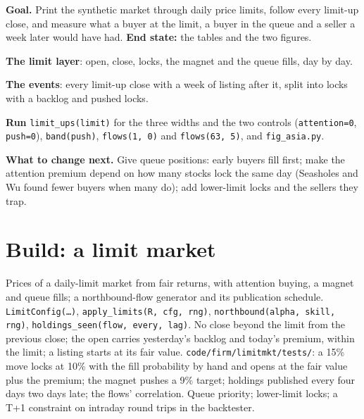 \begin{tutorial}
\textbf{Goal.} Print the synthetic market through daily price limits, follow every limit-up close, and measure what a buyer at the limit, a buyer in
the queue and a seller a week later would have had. \textbf{End state:} the tables and the two figures.
\begin{tutsteps}
\item \textbf{The limit layer}: open, close, locks, the magnet and the queue fills, day by day.
\label{lst:s1:asia-specific-equity-strategies:limits}
\item \textbf{The events}: every limit-up close with a week of listing after it, split into locks with a backlog and pushed locks.
\label{lst:s1:asia-specific-equity-strategies:ups}
\item \textbf{Run} \texttt{limit\_ups(limit)} for the three widths and the two controls (\texttt{attention=0}, \texttt{push=0}), \texttt{band(push)},
\texttt{flows(1, 0)} and \texttt{flows(63, 5)}, and \texttt{fig\_asia.py}.
\end{tutsteps}
\textbf{What to change next.} Give queue positions: early buyers fill first; make the attention premium depend on how many stocks lock the same day
(Seasholes and Wu found fewer buyers when many do); add lower-limit locks and the sellers they trap.
\end{tutorial}

\section{Build: a limit market}\label{bld:s1:asia-specific-equity-strategies:limitmkt}

\begin{build}
 Prices of a daily-limit market from fair returns, with attention buying, a magnet and queue fills; a northbound-flow generator and
its publication schedule.
 \texttt{LimitConfig(\dots)}, \texttt{apply\_limits(R, cfg, rng)}, \texttt{northbound(alpha, skill, rng)}, \texttt{holdings\_seen(flow,
every, lag)}.
 No close beyond the limit from the previous close; the open carries yesterday's backlog and today's premium, within the limit; a listing
starts at its fair value.
 \texttt{code/firm/limitmkt/tests/}: a 15\% move locks at 10\% with the fill probability by hand and opens at the fair value
plus the premium; the magnet pushes a 9\% target; holdings published every four days two days late; the flows' correlation.
 Queue priority; lower-limit locks; a T+1 constraint on intraday round trips in the backtester.
\end{build}


